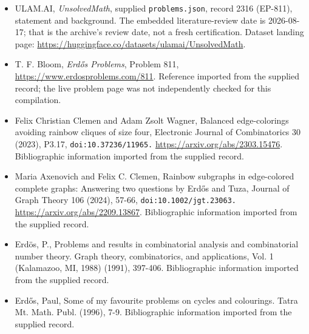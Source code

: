 \documentclass[11pt,a4paper]{article}
\begin{document}
{\small

\begin{itemize}

\item[\hypertarget{source:2316:1}{S1}] ULAM.AI, \emph{UnsolvedMath}, supplied \texttt{problems.json}, record 2316 (EP-811), statement and background. The embedded literature-review date is 2026-08-17; that is the archive’s review date, not a fresh certification. Dataset landing page: \url{https://huggingface.co/datasets/ulamai/UnsolvedMath}.

\item[\hypertarget{source:2316:2}{S2}] T. F. Bloom, \emph{Erdős Problems}, Problem 811, \url{https://www.erdosproblems.com/811}. Reference imported from the supplied record; the live problem page was not independently checked for this compilation.

\item[\hypertarget{source:2316:3}{S3}] Felix Christian Clemen and Adam Zsolt Wagner, Balanced edge-colorings avoiding rainbow cliques of size four, Electronic Journal of Combinatorics 30 (2023), P3.17, \nolinkurl{doi:10.37236/11965.} \url{https://arxiv.org/abs/2303.15476}. Bibliographic information imported from the supplied record.

\item[\hypertarget{source:2316:4}{S4}] Maria Axenovich and Felix C. Clemen, Rainbow subgraphs in edge-colored complete graphs: Answering two questions by Erdős and Tuza, Journal of Graph Theory 106 (2024), 57-66, \nolinkurl{doi:10.1002/jgt.23063.} \url{https://arxiv.org/abs/2209.13867}. Bibliographic information imported from the supplied record.

\item[\hypertarget{source:2316:5}{S5}] Erd\"{o}s, P., Problems and results in combinatorial analysis and combinatorial number theory. Graph theory, combinatorics, and applications, Vol. 1 (Kalamazoo, MI, 1988) (1991), 397-406. Bibliographic information imported from the supplied record.

\item[\hypertarget{source:2316:6}{S6}] Erd\H{o}s, Paul, Some of my favourite problems on cycles and colourings. Tatra Mt. Math. Publ. (1996), 7-9. Bibliographic information imported from the supplied record.

\end{itemize}

}

\label{end:2316}
\end{document}
